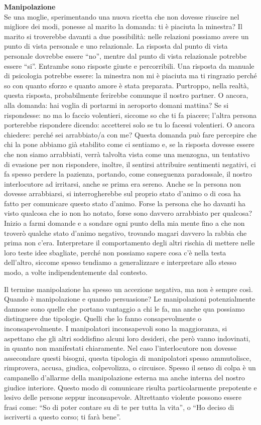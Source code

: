 \documentclass[12pt]{book} %
\begin{document}
\noindent \textbf{\large Manipolazione} \\
Se una moglie, sperimentando una nuova ricetta che non dovesse riuscire nel migliore dei modi,
ponesse al marito la domanda: ti è piaciuta la minestra? Il marito si troverebbe davanti a due possibilità: nelle
relazioni possiamo avere un punto di vista personale e uno relazionale. La risposta dal punto di vista personale
dovrebbe essere “no”, mentre dal punto di vista relazionale potrebbe essere “si”. Entrambe sono risposte giuste e
percorribili. Una risposta da manuale di psicologia potrebbe essere: la minestra non mi è piaciuta ma ti ringrazio
perché so con quanto sforzo e quanto amore è stata preparata. Purtroppo, nella realtà, questa risposta, probabilmente ferirebbe
comunque il nostro partner. O ancora, alla domanda: hai voglia di portarmi in aeroporto domani mattina? Se si
rispondesse: no ma lo faccio volentieri, siccome so che ti fa piacere; l'altra persona porterebbe rispondere dicendo:
accetterei solo se tu lo facessi volentieri. O ancora chiedere: perché sei arrabbiato/a con me? Questa domanda
può fare percepire che chi la pone abbiamo già stabilito come ci sentiamo e, se la risposta dovesse essere che non siamo
arrabbiati, verrà talvolta vista come una menzogna, un tentativo di evasione per non rispondere, inoltre, il sentirsi attribuire
sentimenti negativi, ci fa spesso perdere la pazienza, portando, come conseguenza paradossale, il nostro
interlocutore ad irritarsi, anche se prima era sereno. Anche se la persona non dovesse arrabbiarsi, si interrogherebbe
sul proprio stato d'animo o di cosa ha fatto per comunicare questo stato d'animo. 
Forse la persona che ho davanti ha visto qualcosa che io non ho notato,
forse sono davvero arrabbiato per qualcosa? Inizio a farmi domande e a sondare ogni punto della mia mente fino a che
non troverò qualche stato d'animo negativo, trovando magari davvero la rabbia che prima non
c'era. Interpretare il comportamento degli altri rischia di mettere nelle loro teste idee
sbagliate, perché non possiamo sapere cosa c'è nella testa dell'altro, siccome spesso tendiamo a generalizzare e
interpretare allo stesso modo, a volte indipendentemente dal contesto. 

Il termine manipolazione ha spesso un accezione negativa, ma non è sempre così. Quando è manipolazione e quando persuasione?
Le manipolazioni potenzialmente dannose sono quelle che portano vantaggio a
chi le fa, ma anche qua possiamo distinguere due tipologie. Quelli che lo fanno consapevolmente o inconsapevolmente.
I manipolatori inconsapevoli sono la maggioranza, si aspettano che gli altri soddisfino alcuni loro desideri, che però
vanno indovinati, in quanto non manifestati chiaramente. Nel caso l'interlocutore non dovesse
assecondare questi bisogni, questa tipologia di manipolatori spesso ammutolisce, rimprovera, accusa, giudica, colpevolizza,
o circuisce. Spesso il senso di colpa è un campanello d'allarme della manipolazione esterna ma
anche interna del nostro giudice interiore. Questo modo di comunicare risulta particolarmente prepotente e lesivo delle
persone seppur inconsapevole. Altrettanto violente possono essere frasi come: “So di poter contare su di te per tutta
la vita”, o “Ho deciso di iscriverti a questo corso; ti farà bene”. 
\end{document}

